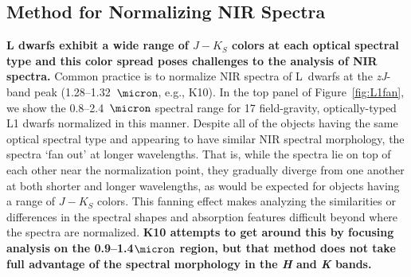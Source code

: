 \documentclass[12pt]{aastex6}
\begin{document}
\subsection{Method for Normalizing NIR Spectra}
\label{sec:method}

\textbf{L dwarfs exhibit a wide range of $J-K_S$ colors at each optical spectral type \cite[e.g.,][]{Kirkpatrick08, Schmidt10, Faherty:2012cy} and this color spread poses challenges to the analysis of NIR spectra.}
Common practice is to normalize NIR spectra of L~dwarfs at the \emph{zJ}-band peak (1.28--1.32~$\micron$, e.g., K10). %
In the top panel of Figure~\ref{fig:L1fan}, we show the 0.8--2.4~$\micron$ spectral range for 17 field-gravity, optically-typed L1 dwarfs normalized in this manner.
Despite all of the objects having the same optical spectral type and appearing to have similar NIR spectral morphology, the spectra `fan out' at longer wavelengths.
That is, while the spectra lie on top of each other near the normalization point, they gradually diverge from one another at both shorter and longer wavelengths, as would be expected for objects having a range of $J-K_S$ colors.
This fanning effect makes analyzing the similarities or differences in the spectral shapes and absorption features difficult beyond where the spectra are normalized.
\textbf{K10 attempts to get around this by focusing analysis on the 0.9--1.4$\micron$ region, but that method does not take full advantage of the spectral morphology in the \emph{H} and \emph{K} bands.}
\end{document}
